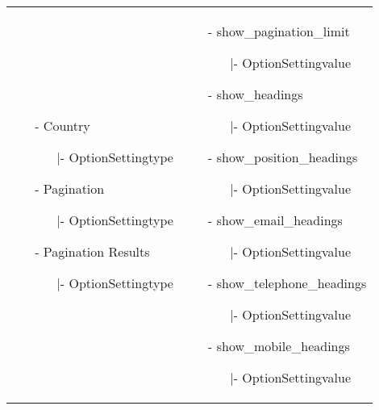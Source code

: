 \begin{minipage}{0.6\textwidth}
\begin{tabular}{|p{} | p{}|}
\begin{itemize}
\begin{enumerate}
		   		\end{enumerate} 
		\item[-] Country
			\begin{enumerate}
		   			\item[|-] OptionSettingtype
		   		\end{enumerate} 
		\item[-] Pagination
			\begin{enumerate}
		   			\item[|-] OptionSettingtype
		   		\end{enumerate} 
		\item[-] Pagination Results
			\begin{enumerate}
		   			\item[|-] OptionSettingtype
		   		\end{enumerate}
	\end{itemize}
 & 
\begin{itemize}
		\item[-] show\_pagination\_limit
		\begin{enumerate}
	   			\item[|-] OptionSettingvalue
	   		\end{enumerate}  
		\item[-] show\_headings
		\begin{enumerate}
		   			\item[|-] OptionSettingvalue
		   		\end{enumerate} 
		\item[-] show\_position\_headings
		\begin{enumerate}
		   			\item[|-] OptionSettingvalue
		   		\end{enumerate} 
		\item[-] show\_email\_headings
			\begin{enumerate}
			   			\item[|-] OptionSettingvalue
			   		\end{enumerate} 
		\item[-] show\_telephone\_headings
			\begin{enumerate}
			   			\item[|-] OptionSettingvalue
			   		\end{enumerate} 
		\item[-] show\_mobile\_headings
			\begin{enumerate}
			   			\item[|-] OptionSettingvalue
			   		\end{enumerate} 

\end{itemize}
\end{tabular}
\end{minipage}
